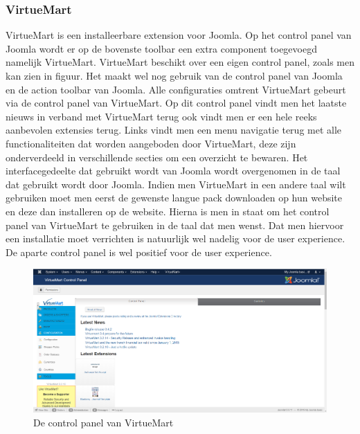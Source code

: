 \subsubsection{VirtueMart}
VirtueMart is een installeerbare extension voor Joomla. Op het control panel van Joomla wordt er op de bovenste toolbar een extra component toegevoegd namelijk VirtueMart. VirtueMart beschikt over een eigen control panel, zoals men kan zien in figuur. Het maakt wel nog gebruik van de control panel van Joomla en de action toolbar van Joomla. Alle configuraties omtrent VirtueMart gebeurt via de control panel van VirtueMart. Op dit control panel vindt men het laatste nieuws in verband met VirtueMart terug ook vindt men er een hele reeks aanbevolen extensies terug. Links vindt men een menu navigatie terug met alle functionaliteiten dat worden aangeboden door VirtueMart, deze zijn onderverdeeld in verschillende secties om een overzicht te bewaren. Het interfacegedeelte dat gebruikt wordt van Joomla wordt overgenomen in de taal dat gebruikt wordt door Joomla. Indien men VirtueMart in een andere taal wilt gebruiken moet men eerst de gewenste langue pack downloaden op hun website en deze dan installeren op de website. Hierna is men in staat om het control panel van VirtueMart te gebruiken in de taal dat men wenst. Dat men hiervoor een installatie moet verrichten is natuurlijk wel nadelig voor de user experience. De aparte control panel is wel positief voor de user experience.
\begin{figure}
	\centering
	\includegraphics[scale = 0.3]{img/virtuemart_controlpanel.png}
	\caption{De control panel van VirtueMart}
	\label{fig:VMcontrolpanel}
\end{figure}
